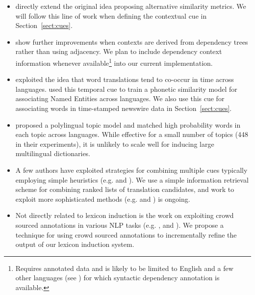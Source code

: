 \documentclass{article}
\newcommand{\mtodo}[1]{}
\newcommand{\secref}[1]{Section~\ref{#1}}
\begin{document}
\begin{itemize}
\setlength{\parskip}{0pt}
  \item \cite{Rapp:1999,Fung:1998} directly extend the original idea proposing alternative similarity metrics.  We will follow this line of work when defining the contextual cue in \secref{sect:cues}.
  \item \cite{Garera:2009} show further improvements when contexts are derived from dependency trees rather than using adjacency.  We plan to include dependency context information whenever available\footnote{Requires annotated data and is likely to be limited to English and a few other languages (see \cite{Nivre:2007}) for which syntactic dependency annotation is available.} into our current implementation.  
  \item \cite{Schafer:2002} exploited the idea that word translations tend to co-occur in time across languages. \cite{Klementiev:2006b} used this temporal cue to train a phonetic similarity model for associating Named Entities across languages.  We also use this cue for associating words in time-stamped newswire data in \secref{sect:cues}.
  \item \cite{Mimno:2009} proposed a polylingual topic model and matched high probability words in each topic across languages.  While effective for a small number of topics (448 in their experiments), it is unlikely to scale well for inducing large multilingual dictionaries.  %
  \item A few authors have exploited strategies for combining multiple cues typically employing simple heuristics (e.g. \cite{Schafer:2002} and \cite{Koehn:2002}).  We use a simple information retrieval scheme for combining ranked lists of translation candidates, and work to exploit more sophisticated methods (e.g. \cite{Klementiev:2006b} and \cite{Klementiev:2008a}) is ongoing.
  \item Not directly related to lexicon induction is the work on exploiting crowd sourced annotations in various NLP tasks (e.g. \cite{Snow:2008}, and \cite{CCB:2009}).  We  propose a technique for using crowd sourced annotations to incrementally refine the output of our lexicon induction system.
\end{itemize}  \mtodo{A few words about the scalability of Haghighli's model.}
\end{document}
